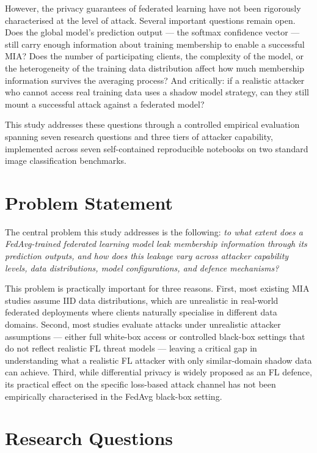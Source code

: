\documentclass[12pt, a4paper]{report}
\begin{document}
However, the privacy guarantees of federated learning have not been rigorously
characterised at the level of attack. Several important questions remain open.
Does the global model's prediction output --- the softmax confidence vector ---
still carry enough information about training membership to enable a successful
MIA? Does the number of participating clients, the complexity of the model, or
the heterogeneity of the training data distribution affect how much membership
information survives the averaging process? And critically: if a realistic
attacker who cannot access real training data uses a shadow model strategy, can
they still mount a successful attack against a federated model?

This study addresses these questions through a controlled empirical evaluation
spanning seven research questions and three tiers of attacker capability,
implemented across seven self-contained reproducible notebooks on two standard
image classification benchmarks.

\section{Problem Statement}

The central problem this study addresses is the following: \textit{to what extent
does a FedAvg-trained federated learning model leak membership information through
its prediction outputs, and how does this leakage vary across attacker capability
levels, data distributions, model configurations, and defence mechanisms?}

This problem is practically important for three reasons. First, most existing MIA
studies assume IID data distributions, which are unrealistic in real-world
federated deployments where clients naturally specialise in different data domains.
Second, most studies evaluate attacks under unrealistic attacker assumptions ---
either full white-box access or controlled black-box settings that do not reflect
realistic FL threat models --- leaving a critical gap in understanding what a
realistic FL attacker with only similar-domain shadow data can achieve. Third, while differential privacy
is widely proposed as an FL defence, its practical effect on the specific
loss-based attack channel has not been empirically characterised in the FedAvg
black-box setting.

\section{Research Questions}
\end{document}
